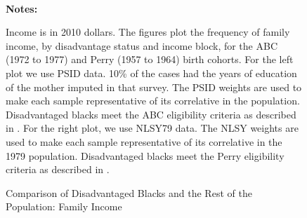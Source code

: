 \begin{figure} \begin{center}\centering
        \caption{Comparison of Disadvantaged Blacks and the Rest of the Population: Family Income}
        \label{graph:abc_moink_all}\vspace{0.2cm}
          \\
\end{center}
{\scriptsize {\bfseries Notes: } \raggedright 
Income is in 2010 dollars. The figures plot the frequency of family income, by disadvantage status and income block, for the ABC (1972 to 1977) and Perry (1957 to 1964) birth cohorts. For the left plot we use PSID data. 10\% of the cases had the years of education of the mother imputed in that survey. The PSID weights are used to make each sample representative  of its correlative in the population. Disadvantaged blacks meet the  ABC eligibility criteria as described in \citet{Ramey_Smith_1977_AJMD}. For the right plot, we use NLSY79 data. The NLSY weights are used to make each sample representative  of its correlative in the 1979 population. Disadvantaged blacks meet the Perry eligibility criteria as described in \citet{heckman2010analyzing}.
}
\end{figure}
\restoregeometry

